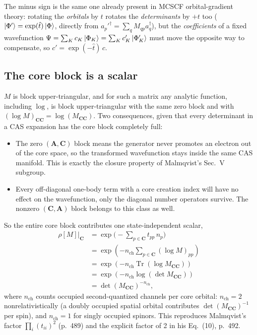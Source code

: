 \documentclass[aip,jcp,preprint]{revtex4-1}
\newcommand{\Tr}{\operatorname{Tr}}
\begin{document}
The minus sign is the same one already present in MCSCF orbital-gradient
theory: rotating the \emph{orbitals} by $t$ rotates the \emph{determinants}
by $+t$ too ($\ket{\Phi'}=\exp(\hat{t})\ket{\Phi}$, directly from
$a_p'^\dagger=\sum_q M_{qp}a_q^\dagger$), but the \emph{coefficients} of a
fixed wavefunction $\Psi=\sum_K c_K\ket{\Phi_K}=\sum_K c'_K\ket{\Phi'_K}$ must
move the opposite way to compensate, so $c'=\exp(-\hat{t})\,c$.

\subsection{The core block is a scalar}

$M$ is block upper-triangular, and for such a matrix any analytic function,
including $\log$, is block upper-triangular with the same zero block and
with $(\log M)_{\mathbf{C}\mathbf{C}} = \log (M_{\mathbf{C}\mathbf{C}})$. 
Two consequences, given that every
determinant in a CAS expansion has the core block completely full:

\begin{itemize}
\item The zero $(\mathbf{A},\mathbf{C})$ block means the generator never promotes an electron
out of the core space, so the transformed wavefunction stays inside the
same CAS manifold. This is exactly the closure property of Malmqvist's
Sec.~V subgroup.
\item Every off-diagonal one-body term with a core creation index will have 
no effect on the wavefunction, only the diagonal number operators survive. 
The nonzero $(\mathbf{C},\mathbf{A})$ block belongs to this class as well.

\end{itemize}

So the entire core block contributes one state-independent scalar,
\begin{equation}
\begin{aligned}
\rho[M]\big|_{\mathbf{C}}&=\exp\!\Big(-\sum_{p\in \mathbf{C}} t_{pp}\, n_p\Big)\\
&=\exp\left(-n_{\mathrm{ch}}\sum_{p\in\mathbf{C}}(\log M)_{pp}\right)\\
&=\exp\left(-n_{\mathrm{ch}}\Tr(\log{M}_{\mathbf{CC}})\right)\\
&=\exp\left(-n_{\mathrm{ch}}\log(\det{M}_{\mathbf{CC}})\right)\\
& =\det(M_{\mathbf{C}\mathbf{C}})^{-n_\mathrm{ch}},
 \label{eq:docc-scalar}
\end{aligned}
\end{equation}
where $n_\mathrm{ch}$ counts occupied second-quantized channels per core
orbital: $n_\mathrm{ch}=2$ nonrelativistically (a doubly occupied spatial
orbital contributes $\det(M_{\mathbf{C}\mathbf{C}})^{-1}$ per spin), and $n_\mathrm{ch}=1$ for
singly occupied spinors. This reproduces Malmqvist's factor
$\prod_i (t_{ii})^2$ (p.~489) and the explicit factor of 2 in his Eq.~(10),
p.~492.
\end{document}
